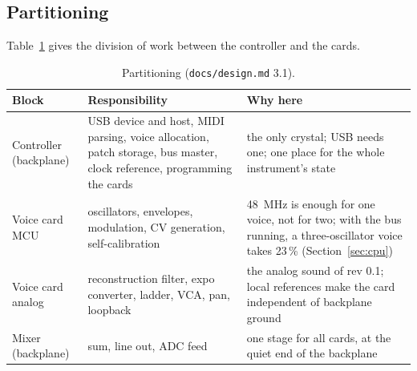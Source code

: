 \documentclass[11pt,a4paper]{article}
\newcommand{\file}[1]{\texttt{#1}}
\begin{document}
\subsection{Partitioning}
Table~\ref{tab:part} gives the division of work between the controller and the cards.

\begin{table}[htbp]
\centering\small
\caption{Partitioning (\file{docs/design.md} 3.1).}\label{tab:part}
\begin{tabularx}{\textwidth}{@{}>{\raggedright}p{2.6cm} >{\raggedright}X >{\raggedright\arraybackslash}X@{}}
\toprule
Block & Responsibility & Why here \\
\midrule
Controller (backplane) & USB device and host, MIDI parsing, voice allocation, patch storage, bus master, clock
  reference, programming the cards & the only crystal; USB needs one; one place for the whole instrument's state \\
Voice card MCU & oscillators, envelopes, modulation, CV generation, self-calibration & \SI{48}{MHz} is enough for one
  voice, not for two; with the bus running, a three-oscillator voice takes 23\,\% (Section~\ref{sec:cpu}) \\
Voice card analog & reconstruction filter, expo converter, ladder, VCA, pan, loopback & the analog sound of rev 0.1;
  local references make the card independent of backplane ground \\
Mixer (backplane) & sum, line out, ADC feed & one stage for all cards, at the quiet end of the backplane \\
\bottomrule
\end{tabularx}
\end{table}
\end{document}
